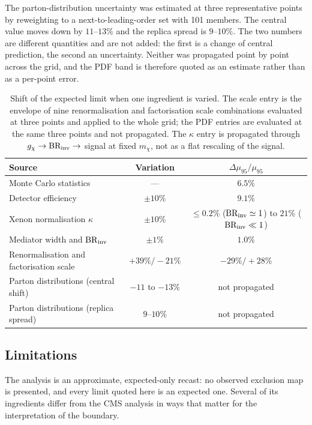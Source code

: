 The parton-distribution uncertainty was estimated at three representative points by reweighting to a next-to-leading-order set with 101 members. The central value moves down by $11$--$13\%$ and the replica spread is $9$--$10\%$. The two numbers are different quantities and are not added: the first is a change of central prediction, the second an uncertainty. Neither was propagated point by point across the grid, and the PDF band is therefore quoted as an estimate rather than as a per-point error.

\begin{table}[htbp]
\centering
\caption{Shift of the expected limit when one ingredient is varied. The scale entry is the envelope of nine renormalisation and factorisation scale combinations evaluated at three points and applied to the whole grid; the PDF entries are evaluated at the same three points and not propagated. The $\kappa$ entry is propagated through $g_\chi\to{\rm BR_{inv}}\to$ signal at fixed $m_\chi$, not as a flat rescaling of the signal.}
\label{tab:syst}
\begin{tabular}{lcc}
\toprule
Source & Variation & $\Delta\mu_{95}/\mu_{95}$ \\
\midrule
Monte Carlo statistics & --- & $6.5\%$ \\
Detector efficiency & $\pm10\%$ & $9.1\%$ \\
Xenon normalisation $\kappa$ & $\pm10\%$ & $\le0.2\%$ (${\rm BR_{inv}}\simeq1$) to $21\%$ (${\rm BR_{inv}}\ll1$) \\
Mediator width and $\mathrm{BR}_{\rm inv}$ & $\pm1\%$ & $1.0\%$ \\
Renormalisation and factorisation scale & $+39\%/-21\%$ & $-29\%/+28\%$ \\
Parton distributions (central shift) & $-11$ to $-13\%$ & not propagated \\
Parton distributions (replica spread) & $9$--$10\%$ & not propagated \\
\bottomrule
\end{tabular}
\end{table}

\subsection{Limitations}

The analysis is an approximate, expected-only recast: no observed exclusion map is presented, and every limit quoted here is an expected one. Several of its ingredients differ from the CMS analysis in ways that matter for the interpretation of the boundary.

